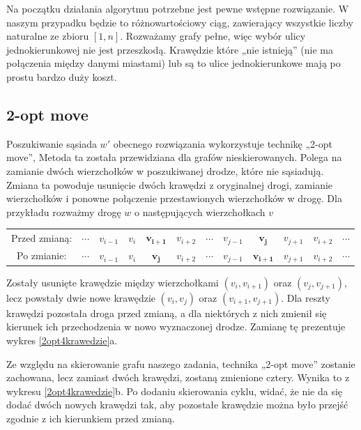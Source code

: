 \documentclass[11pt,a4paper,twoside]{article}
\begin{document}
Na początku działania algorytmu potrzebne jest pewne wstępne rozwiązanie. W naszym przypadku będzie to różnowartościowy ciąg, zawierający wszystkie liczby naturalne ze zbioru $[1,n]$. Rozważamy grafy pełne, więc wybór ulicy jednokierunkowej nie jest przeszkodą. Krawędzie które „nie istnieją” (nie ma połączenia między danymi miastami) lub są to ulice jednokierunkowe mają po prostu bardzo duży koszt.

\subsection{2-opt move}
Poszukiwanie sąsiada $w'$ obecnego rozwiązania wykorzystuje technikę „2-opt move”, Metoda ta została przewidziana dla grafów nieskierowanych. Polega na zamianie dwóch wierzchołków w poszukiwanej drodze, które nie sąsiadują. Zmiana ta powoduje usunięcie dwóch krawędzi z oryginalnej drogi, zamianie wierzchołków i ponowne połączenie przestawionych wierzchołków w drogę. Dla przykładu rozważmy drogę $w$ o następujących wierzchołkach $v$

\bgroup
\def\arraystretch{1.5}
\begin{tabular}{cccccccccccc}
Przed zmianą: & $\cdots$ & $v_{i-1}$ & $v_{i}$ & $\mathbf{v_{i+1}}$ & $v_{i+2}$ & $\cdots$ & $v_{j-1}$ & $\mathbf{v_{j}}$ & $v_{j+1}$ & $v_{i+2}$ & $\cdots$\\
Po zmianie: & $\cdots$ & $v_{i-1}$ & $v_{i}$ & $\mathbf{v_{j}}$ & $v_{i+2}$ & $\cdots$ & $v_{j-1}$ & $\mathbf{v_{i+1}}$ & $v_{j+1}$ & $v_{i+2}$ & $\cdots$\\
\end{tabular}
\egroup

Zostały usunięte krawędzie między wierzchołkami $(v_{i}, v_{i+1})$ oraz $(v_{j}, v_{j+1})$, lecz powstały dwie nowe krawędzie $(v_{i}, v_{j})$ oraz $(v_{i+1}, v_{j+1})$. Dla reszty krawędzi pozostała droga przed zmianą, a dla niektórych z nich zmienił się kierunek ich przechodzenia w nowo wyznaczonej drodze. Zamianę tę prezentuje wykres \ref{2opt4krawedzie}a.

Ze względu na skierowanie grafu naszego zadania, technika „2-opt move” zostanie zachowana, lecz zamiast dwóch krawędzi, zostaną zmienione cztery. Wynika to z wykresu \ref{2opt4krawedzie}b. Po dodaniu skierowania cyklu, widać, że nie da się dodać dwóch nowych krawędzi tak, aby pozostałe krawędzie można było przejść zgodnie z ich kierunkiem przed zmianą.
\end{document}
